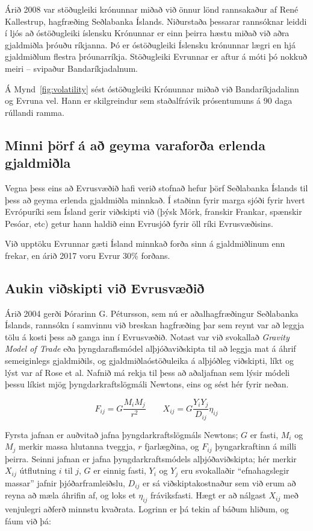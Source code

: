 \documentclass[a4paper]{article}
\begin{document}
Árið 2008 var stöðugleiki krónunnar miðað við önnur lönd rannsakaður af René Kallestrup, hagfræðing Seðlabanka Íslands. Niðurstaða þessarar rannsóknar leiddi í ljós að óstöðugleiki íslensku Krónunnar er einn þeirra hæstu miðað við aðra gjaldmiðla þróuðu ríkjanna. Þó er óstöðugleiki Íslensku krónunnar lægri en hjá gjaldmiðlum flestra þróunarríkja. Stöðugleiki Evrunnar er aftur á móti þó nokkuð meiri – svipaður Bandaríkjadalnum.\cite{icb_volatility_2008}

Á Mynd~\ref{fig:volatility} sést óstöðugleiki Krónunnar miðað við Bandaríkjadalinn og Evruna vel. Hann er skilgreindur sem staðalfrávik prósentumuns á 90 daga rúllandi ramma.


\subsection{Minni þörf á að geyma varaforða erlenda gjaldmiðla}

Vegna þess eins að Evrusvæðið hafi verið stofnað hefur þörf Seðlabanka Íslands til þess að geyma erlenda gjaldmiðla minnkað. Í staðinn fyrir marga sjóði fyrir hvert Evrópuríki sem Ísland gerir viðskipti við (þýsk Mörk, franskir Frankar, spænskir Pesóar, etc) getur hann haldið einn Evrusjóð fyrir öll ríki Evrusvæðisins.

Við upptöku Evrunnar gæti Ísland minnkað forða sinn á gjaldmiðlinum enn frekar\cite{saga_evropusamrunans}, en árið 2017 voru Evrur 30\% forðans.\cite{icb_annual_2017}

\subsection{Aukin viðskipti við Evrusvæðið}

Árið 2004 gerði Þórarinn G. Pétursson, sem nú er aðalhagfræðingur Seðlabanka Íslands, rannsókn í samvinnu við breskan hagfræðing þar sem reynt var að leggja tölu á kosti þess að ganga inn í Evrusvæðið. Notast var við svokallað \textit{Gravity Model of Trade} eða þyngdaraflsmódel alþjóðaviðskipta til að leggja mat á áhrif semeiginlegs gjaldmiðils, og gjaldmiðlaóstöðuleika á alþjóðleg viðskipti, líkt og lýst var af Rose et al.\cite{rose2000} Nafnið má rekja til þess að aðaljafnan sem lýsir módeli þessu líkist mjög þyngdarkraftslögmáli Newtons, eins og sést hér fyrir neðan.

\[F_{ij} = G\frac{M_{i}M_{j}}{r^{2}} \qquad X_{ij} = G\frac{Y_{i}Y_{j}}{D_{ij}}\eta_{ij}\]

Fyrsta jafnan er auðvitað jafna þyngdarkraftslögmáls Newtons; \(G\) er fasti, \(M_{i}\) og \(M_{j}\) merkir massa hlutanna tveggja, \(r\) fjarlægðina, og \(F_{ij}\) þyngarkraftinn á milli þeirra. Seinni jafnan er jafna þyngdarkraftsmódels alþjóðaviðskipta; hér merkir \(X_{ij}\) útflutning \(i\) til \(j\), \(G\) er einnig fasti, \(Y_{i}\) og \(Y_{j}\) eru svokallaðir ``efnahagslegir massar'' jafnir þjóðarframleiðslu, \(D_{ij}\) er sá viðskiptakostnaður sem við erum að reyna að mæla áhrifin af, og loks et \(\eta_{ij}\) fráviksfasti. Hægt er að nálgast \(X_{ij}\) með venjulegri aðferð minnstu kvaðrata. Logrinn er þá tekin af báðum hliðum, og fáum við þá:
\end{document}
